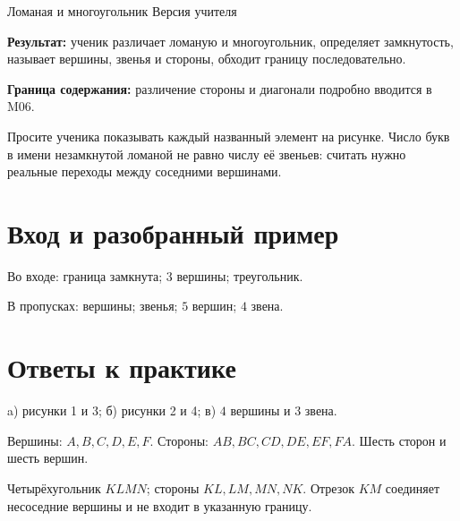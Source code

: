 \worksheettitle
  {Ломаная и многоугольник}
  { Версия учителя}

\begin{teacherbox}
  \textbf{Результат:} ученик различает ломаную и многоугольник, определяет
  замкнутость, называет вершины, звенья и стороны, обходит границу
  последовательно.

  \textbf{Граница содержания:} различение стороны и диагонали подробно
  вводится в M06.
\end{teacherbox}

\begin{teacherbox}
  Просите ученика показывать каждый названный элемент на рисунке. Число букв
  в имени незамкнутой ломаной не равно числу её звеньев: считать нужно
  реальные переходы между соседними вершинами.
\end{teacherbox}

\section{Вход и разобранный пример}

Во входе: граница замкнута; $3$ вершины; треугольник.

\openbrokenfigure

В пропусках: вершины; звенья; $5$ вершин; $4$ звена.

\section{Ответы к практике}

\studentrecognizefigure

\begin{practicebox}
  a) рисунки 1 и 3; б) рисунки 2 и 4; в) $4$ вершины и $3$ звена.
\end{practicebox}

\polygonpartsfigure

\begin{practicebox}
  Вершины: $A,B,C,D,E,F$. Стороны: $AB,BC,CD,DE,EF,FA$.
  Шесть сторон и шесть вершин.
\end{practicebox}

\begin{practicebox}[3. Самостоятельно]
  Четырёхугольник $KLMN$; стороны $KL,LM,MN,NK$.
  Отрезок $KM$ соединяет несоседние вершины и не входит в указанную границу.
\end{practicebox}

